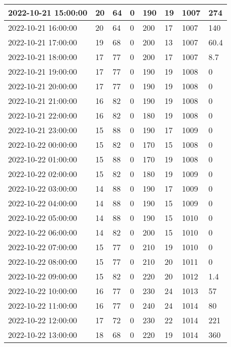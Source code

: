 \begin{longtable}{|l|l|l|l|l|l|l|l|}
        2022-10-21 15:00:00 & 20 & 64 & 0 & 190 & 19 & 1007 & 274 \\ \hline
        2022-10-21 16:00:00 & 20 & 64 & 0 & 200 & 17 & 1007 & 140 \\ \hline
        2022-10-21 17:00:00 & 19 & 68 & 0 & 200 & 13 & 1007 & 60.4 \\ \hline
        2022-10-21 18:00:00 & 17 & 77 & 0 & 200 & 17 & 1007 & 8.7 \\ \hline
        2022-10-21 19:00:00 & 17 & 77 & 0 & 190 & 19 & 1008 & 0 \\ \hline
        2022-10-21 20:00:00 & 17 & 77 & 0 & 190 & 19 & 1008 & 0 \\ \hline
        2022-10-21 21:00:00 & 16 & 82 & 0 & 190 & 19 & 1008 & 0 \\ \hline
        2022-10-21 22:00:00 & 16 & 82 & 0 & 180 & 19 & 1008 & 0 \\ \hline
        2022-10-21 23:00:00 & 15 & 88 & 0 & 190 & 17 & 1009 & 0 \\ \hline
        2022-10-22 00:00:00 & 15 & 82 & 0 & 170 & 15 & 1008 & 0 \\ \hline
        2022-10-22 01:00:00 & 15 & 88 & 0 & 170 & 19 & 1008 & 0 \\ \hline
        2022-10-22 02:00:00 & 15 & 82 & 0 & 180 & 19 & 1009 & 0 \\ \hline
        2022-10-22 03:00:00 & 14 & 88 & 0 & 190 & 17 & 1009 & 0 \\ \hline
        2022-10-22 04:00:00 & 14 & 88 & 0 & 190 & 15 & 1009 & 0 \\ \hline
        2022-10-22 05:00:00 & 14 & 88 & 0 & 190 & 15 & 1010 & 0 \\ \hline
        2022-10-22 06:00:00 & 14 & 82 & 0 & 200 & 15 & 1010 & 0 \\ \hline
        2022-10-22 07:00:00 & 15 & 77 & 0 & 210 & 19 & 1010 & 0 \\ \hline
        2022-10-22 08:00:00 & 15 & 77 & 0 & 210 & 20 & 1011 & 0 \\ \hline
        2022-10-22 09:00:00 & 15 & 82 & 0 & 220 & 20 & 1012 & 1.4 \\ \hline
        2022-10-22 10:00:00 & 16 & 77 & 0 & 230 & 24 & 1013 & 57 \\ \hline
        2022-10-22 11:00:00 & 16 & 77 & 0 & 240 & 24 & 1014 & 80 \\ \hline
        2022-10-22 12:00:00 & 17 & 72 & 0 & 230 & 22 & 1014 & 221 \\ \hline
        2022-10-22 13:00:00 & 18 & 68 & 0 & 220 & 19 & 1014 & 360 \\ \hline

\end{longtable}
